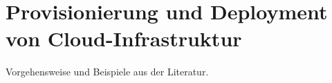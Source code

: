 \section{Provisionierung und Deployment von Cloud-Infrastruktur}

Vorgehensweise und Beispiele aus der Literatur.




